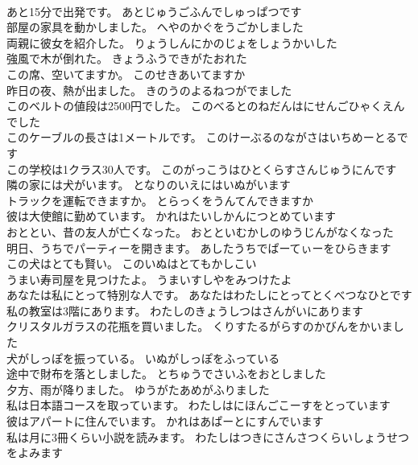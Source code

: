 \documentclass[8pt]{extreport}
\begin{document}
\begin{CJK}{UTF8}{min}
\\	あと15分で出発です。	あとじゅうごふんでしゅっぱつです 
\\	部屋の家具を動かしました。	へやのかぐをうごかしました 
\\	両親に彼女を紹介した。	りょうしんにかのじょをしょうかいした 
\\	強風で木が倒れた。	きょうふうできがたおれた 
\\	この席、空いてますか。	このせきあいてますか 
\\	昨日の夜、熱が出ました。	きのうのよるねつがでました 
\\	このベルトの値段は2500円でした。	このべるとのねだんはにせんごひゃくえんでした 
\\	このケーブルの長さは1メートルです。	このけーぶるのながさはいちめーとるです 
\\	この学校は1クラス30人です。	このがっこうはひとくらすさんじゅうにんです 
\\	隣の家には犬がいます。	となりのいえにはいぬがいます 
\\	トラックを運転できますか。	とらっくをうんてんできますか 
\\	彼は大使館に勤めています。	かれはたいしかんにつとめています 
\\	おととい、昔の友人が亡くなった。	おとといむかしのゆうじんがなくなった 
\\	明日、うちでパーティーを開きます。	あしたうちでぱーてぃーをひらきます 
\\	この犬はとても賢い。	このいぬはとてもかしこい 
\\	うまい寿司屋を見つけたよ。	うまいすしやをみつけたよ 
\\	あなたは私にとって特別な人です。	あなたはわたしにとってとくべつなひとです 
\\	私の教室は3階にあります。	わたしのきょうしつはさんがいにあります 
\\	クリスタルガラスの花瓶を買いました。	くりすたるがらすのかびんをかいました 
\\	犬がしっぽを振っている。	いぬがしっぽをふっている 
\\	途中で財布を落としました。	とちゅうでさいふをおとしました 
\\	夕方、雨が降りました。	ゆうがたあめがふりました 
\\	私は日本語コースを取っています。	わたしはにほんごこーすをとっています 
\\	彼はアパートに住んでいます。	かれはあぱーとにすんでいます 
\\	私は月に3冊くらい小説を読みます。	わたしはつきにさんさつくらいしょうせつをよみます 

\end{CJK}
\end{document}
